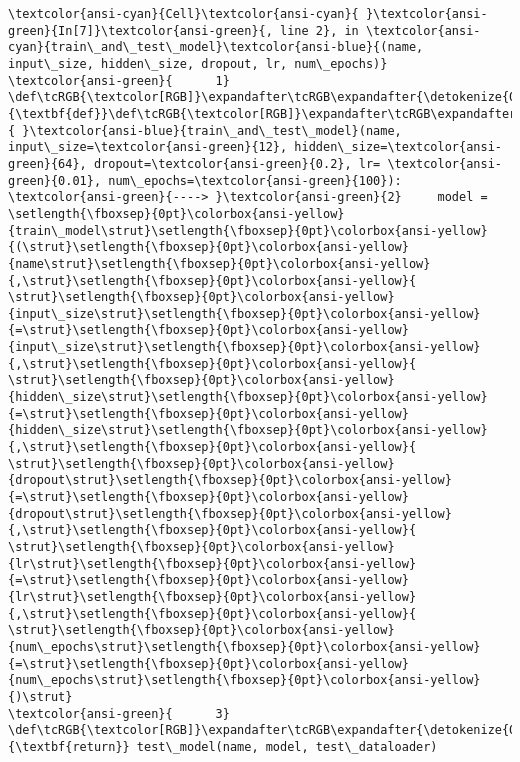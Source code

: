 \documentclass[11pt]{article}
\begin{document}
\begin{Verbatim}[commandchars=\\\{\}, frame=single, framerule=2mm, rulecolor=\color{outerrorbackground}]
\textcolor{ansi-cyan}{Cell}\textcolor{ansi-cyan}{ }\textcolor{ansi-green}{In[7]}\textcolor{ansi-green}{, line 2}, in \textcolor{ansi-cyan}{train\_and\_test\_model}\textcolor{ansi-blue}{(name, input\_size, hidden\_size, dropout, lr, num\_epochs)}
\textcolor{ansi-green}{      1} \def\tcRGB{\textcolor[RGB]}\expandafter\tcRGB\expandafter{\detokenize{0,135,0}}{\textbf{def}}\def\tcRGB{\textcolor[RGB]}\expandafter\tcRGB\expandafter{\detokenize{188,188,188}}{ }\textcolor{ansi-blue}{train\_and\_test\_model}(name, input\_size=\textcolor{ansi-green}{12}, hidden\_size=\textcolor{ansi-green}{64}, dropout=\textcolor{ansi-green}{0.2}, lr= \textcolor{ansi-green}{0.01}, num\_epochs=\textcolor{ansi-green}{100}):
\textcolor{ansi-green}{----> }\textcolor{ansi-green}{2}     model = \setlength{\fboxsep}{0pt}\colorbox{ansi-yellow}{train\_model\strut}\setlength{\fboxsep}{0pt}\colorbox{ansi-yellow}{(\strut}\setlength{\fboxsep}{0pt}\colorbox{ansi-yellow}{name\strut}\setlength{\fboxsep}{0pt}\colorbox{ansi-yellow}{,\strut}\setlength{\fboxsep}{0pt}\colorbox{ansi-yellow}{ \strut}\setlength{\fboxsep}{0pt}\colorbox{ansi-yellow}{input\_size\strut}\setlength{\fboxsep}{0pt}\colorbox{ansi-yellow}{=\strut}\setlength{\fboxsep}{0pt}\colorbox{ansi-yellow}{input\_size\strut}\setlength{\fboxsep}{0pt}\colorbox{ansi-yellow}{,\strut}\setlength{\fboxsep}{0pt}\colorbox{ansi-yellow}{ \strut}\setlength{\fboxsep}{0pt}\colorbox{ansi-yellow}{hidden\_size\strut}\setlength{\fboxsep}{0pt}\colorbox{ansi-yellow}{=\strut}\setlength{\fboxsep}{0pt}\colorbox{ansi-yellow}{hidden\_size\strut}\setlength{\fboxsep}{0pt}\colorbox{ansi-yellow}{,\strut}\setlength{\fboxsep}{0pt}\colorbox{ansi-yellow}{ \strut}\setlength{\fboxsep}{0pt}\colorbox{ansi-yellow}{dropout\strut}\setlength{\fboxsep}{0pt}\colorbox{ansi-yellow}{=\strut}\setlength{\fboxsep}{0pt}\colorbox{ansi-yellow}{dropout\strut}\setlength{\fboxsep}{0pt}\colorbox{ansi-yellow}{,\strut}\setlength{\fboxsep}{0pt}\colorbox{ansi-yellow}{ \strut}\setlength{\fboxsep}{0pt}\colorbox{ansi-yellow}{lr\strut}\setlength{\fboxsep}{0pt}\colorbox{ansi-yellow}{=\strut}\setlength{\fboxsep}{0pt}\colorbox{ansi-yellow}{lr\strut}\setlength{\fboxsep}{0pt}\colorbox{ansi-yellow}{,\strut}\setlength{\fboxsep}{0pt}\colorbox{ansi-yellow}{ \strut}\setlength{\fboxsep}{0pt}\colorbox{ansi-yellow}{num\_epochs\strut}\setlength{\fboxsep}{0pt}\colorbox{ansi-yellow}{=\strut}\setlength{\fboxsep}{0pt}\colorbox{ansi-yellow}{num\_epochs\strut}\setlength{\fboxsep}{0pt}\colorbox{ansi-yellow}{)\strut}
\textcolor{ansi-green}{      3}     \def\tcRGB{\textcolor[RGB]}\expandafter\tcRGB\expandafter{\detokenize{0,135,0}}{\textbf{return}} test\_model(name, model, test\_dataloader)


\end{Verbatim}
\end{document}
